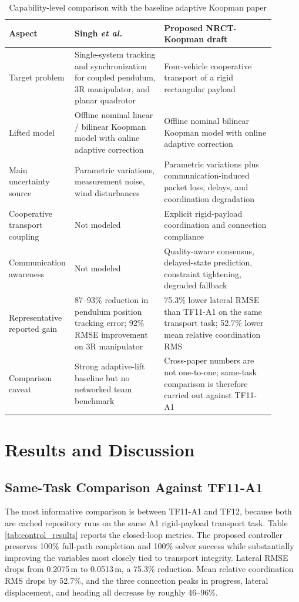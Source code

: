 \documentclass[twocolumn,3p,times,procedia]{elsarticle}
\newcommand{\methodname}{NRCT-Koopman}
\newcommand{\tfone}{TF11-A1}
\newcommand{\tftwo}{TF12}
\begin{document}
\begin{table}[t]
\footnotesize
\centering
\begin{threeparttable}
\setlength{\abovecaptionskip}{0pt}
\caption{Capability-level comparison with the baseline adaptive Koopman paper \cite{singh2024adaptive}}
\label{tab:capability_compare}
\begin{tabular}{p{0.16\linewidth} p{0.33\linewidth} p{0.41\linewidth}}
\toprule
Aspect & Singh \emph{et al.} \cite{singh2024adaptive} & Proposed \methodname{} draft \\
\midrule
Target problem & Single-system tracking and synchronization for coupled pendulum, 3R manipulator, and planar quadrotor & Four-vehicle cooperative transport of a rigid rectangular payload \\
Lifted model & Offline nominal linear / bilinear Koopman model with online adaptive correction & Offline nominal bilinear Koopman model with online adaptive correction \\
Main uncertainty source & Parametric variations, measurement noise, wind disturbances & Parametric variations plus communication-induced packet loss, delays, and coordination degradation \\
Cooperative transport coupling & Not modeled & Explicit rigid-payload coordination and connection compliance \\
Communication awareness & Not modeled & Quality-aware consensus, delayed-state prediction, constraint tightening, degraded fallback \\
Representative reported gain & 87--93\% reduction in pendulum position tracking error; 92\% RMSE improvement on 3R manipulator & 75.3\% lower lateral RMSE than \tfone{} on the same transport task; 52.7\% lower mean relative coordination RMS \\
Comparison caveat & Strong adaptive-lift baseline but no networked team benchmark & Cross-paper numbers are not one-to-one; same-task comparison is therefore carried out against \tfone{} \\
\bottomrule
\end{tabular}
\end{threeparttable}
\end{table}

\section{Results and Discussion}
\subsection{Same-Task Comparison Against \tfone{}}
The most informative comparison is between \tfone{} and \tftwo{}, because both are cached repository runs on the same A1 rigid-payload transport task. Table \ref{tab:control_results} reports the closed-loop metrics. The proposed controller preserves 100\% full-path completion and 100\% solver success while substantially improving the variables most closely tied to transport integrity. Lateral RMSE drops from 0.2075\,m to 0.0513\,m, a 75.3\% reduction. Mean relative coordination RMS drops by 52.7\%, and the three connection peaks in progress, lateral displacement, and heading all decrease by roughly 46--96\%.
\end{document}
